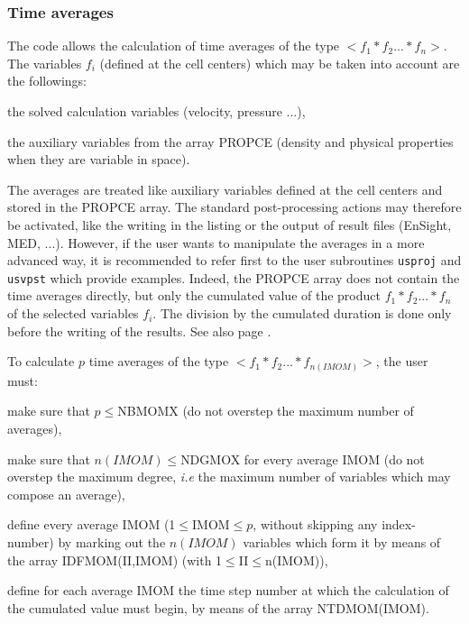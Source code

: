 \subsubsection{Time averages}

The code allows the calculation of time averages of the type
$<f_1*f_2...*f_n>$. The variables $f_i$ (defined at the cell centers)
which may be taken into account are the followings:
\begin{list}{-}{}
\item the solved calculation variables (velocity, pressure ...),
\item the auxiliary variables from the array PROPCE (density and
      physical properties when they are variable in space).
\end{list}

The averages are treated like auxiliary variables defined at the cell
centers and stored in the PROPCE array. The standard post-processing
actions may therefore be activated, like the writing in the listing or
the output of result files (EnSight, MED, ...). However, if the user
wants to manipulate the averages in a more advanced way, it is
recommended to refer first to the user subroutines \texttt{usproj} and
\texttt{usvpst} which provide examples. Indeed, the PROPCE array 
does not contain the time averages directly, but only the cumulated value 
of the product $f_1*f_2...*f_n$ of the selected
variables $f_i$. The division by the cumulated duration is done only
before the writing of the results. See also page \pageref{prg_moyennes}. 

To calculate $p$ time averages of the type $<f_1*f_2...*f_{n(IMOM)}>$,
the user must:
\begin{list}{-}{}
\item make sure that $p\leqslant$NBMOMX (do not overstep the maximum
      number of averages),
\item make sure that $n(IMOM)\leqslant$NDGMOX for every average IMOM
       (do not overstep the maximum degree, {\it i.e} the maximum number
       of variables which may compose an average),
\item define every average IMOM (1$\leqslant$IMOM$\leqslant p$, without
      skipping any index-number) by marking out the $n(IMOM)$ variables
      which form it by means of the array IDFMOM(II,IMOM) (with
      1$\leqslant$II$\leqslant$n(IMOM)), 
\item define for each average IMOM the time step number at which the
      calculation of the cumulated value must begin, by means of the
      array NTDMOM(IMOM).
\end{list}

